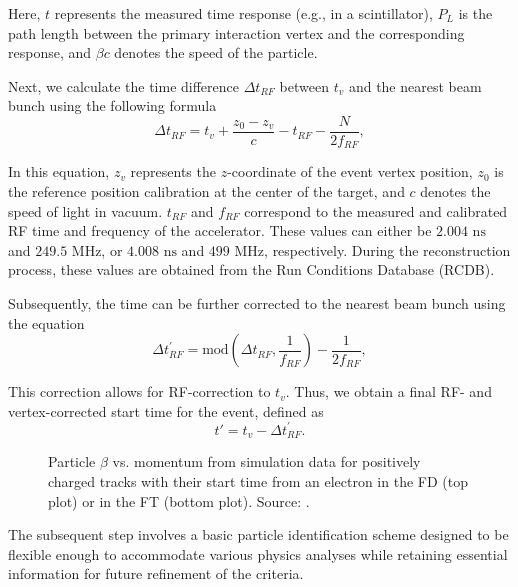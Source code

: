     Here, $t$ represents the measured time response (e.g., in a scintillator), $P_L$ is the path length between the primary interaction vertex and the corresponding response, and $\beta c$ denotes the speed of the particle.

    Next, we calculate the time difference $\Delta t_{RF}$ between $t_v$ and the nearest beam bunch using the following formula
    \begin{equation*}
        \Delta t_{RF} = t_v + \frac{z_0 - z_v}{c} - t_{RF} - \frac{N}{2f_{RF}},
    \end{equation*}

    In this equation, $z_v$ represents the $z$-coordinate of the event vertex position, $z_0$ is the reference position calibration at the center of the target, and $c$ denotes the speed of light in vacuum.
    $t_{RF}$ and $f_{RF}$ correspond to the measured and calibrated RF time and frequency of the accelerator.
    These values can either be $2.004 \text{ ns}$ and $249.5 \text{ MHz}$, or $4.008 \text{ ns}$ and $499 \text{ MHz}$, respectively.
    During the reconstruction process, these values are obtained from the Run Conditions Database (RCDB).

    Subsequently, the time can be further corrected to the nearest beam bunch using the equation
    \begin{equation*}
        \Delta t^\prime_{RF} = \text{mod}\left(\Delta t_{RF}, \frac{1}{f_{RF}}\right) - \frac{1}{2f_{RF}},
    \end{equation*}

    This correction allows for RF-correction to $t_v$. Thus, we obtain a final RF- and vertex-corrected start time for the event, defined as
    \begin{equation*}
        t' = t_v - \Delta t^\prime_{RF}.
    \end{equation*}

    \begin{wrapfigure}{r}{0.49\textwidth}
        \centering{}
        \caption[Particle $\beta$ vs. momentum for positively charged tracks.]{Particle $\beta$ vs. momentum from simulation data for positively charged tracks with their start time from an electron in the FD (top plot) or in the FT (bottom plot).
        Source: \cite{ziegler2020}.}
        \label{fig::11.232::positive_pid}
    \end{wrapfigure}

    The subsequent step involves a basic particle identification scheme designed to be flexible enough to accommodate various physics analyses while retaining essential information for future refinement of the criteria.

